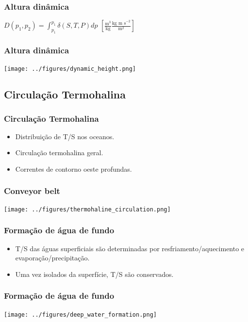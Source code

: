 \begin{frame}
 \frametitle{Altura dinâmica}
 \begin{block}{}
  \(D(p_1, p_2) = \int^{p_1}_{p_1}\delta(S, T, P)dp\)
  \hspace{1cm} \( \left[\frac{\text{m}^3}{\text{kg}} \frac{\text{kg m s}^{-2}}{\text{m}^2}\right]\)
 \end{block}
\end{frame}


\begin{frame}
  \frametitle{Altura dinâmica}
  \begin{center}
    \texttt{[image: ../figures/dynamic\_height.png]}
  \end{center}
\end{frame}


\subsection{Circulação Termohalina}
\begin{frame}
  \frametitle{Circulação Termohalina}
 \begin{itemize}[<+-| alert@+>]
  \item Distribuição de T/S nos oceanos.
  \item Circulação termohalina geral.
  \item Correntes de contorno oeste profundas.
 \end{itemize}
\end{frame}


\begin{frame}
  \frametitle{Conveyor belt}
  \begin{center}
    \texttt{[image: ../figures/thermohaline\_circulation.png]}
  \end{center}
\end{frame}


\begin{frame}
  \frametitle{Formação de água de fundo}
  \begin{itemize}[<+-| alert@+>]
    \item T/S das águas superficiais são determinadas por
          resfriamento/aquecimento e evaporação/precipitação.
    \item Uma vez isolados da superfície, T/S são conservados.
  \end{itemize}
\end{frame}


\begin{frame}
  \frametitle{Formação de água de fundo}
  \begin{center}
    \texttt{[image: ../figures/deep\_water\_formation.png]}
  \end{center}
\end{frame}


